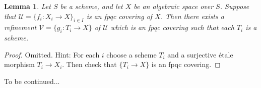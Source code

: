 \documentclass{stacks-project}
\theoremstyle{plain}
\newtheorem{lemma}[subsection]{Lemma}
\theoremstyle{definition}
\theoremstyle{remark}
\numberwithin{equation}{subsection}
\begin{document}
\begin{lemma}
\label{lemma-refine-fpqc-schemes}
Let $S$ be a scheme, and let $X$ be an algebraic space over $S$.
Suppose that $\mathcal{U} = \{f_i : X_i \to X\}_{i \in I}$ is an
fpqc covering of $X$. Then there exists a refinement
$\mathcal{V} = \{g_i : T_i \to X\}$ of $\mathcal{U}$ which is an
fpqc covering such that each $T_i$ is a scheme.
\end{lemma}

\begin{proof}
Omitted. Hint: For each $i$ choose a scheme $T_i$ and a surjective \'etale
morphism $T_i \to X_i$. Then check that $\{T_i \to X\}$ is an fpqc covering.
\end{proof}

\noindent
To be continued...










\end{document}
